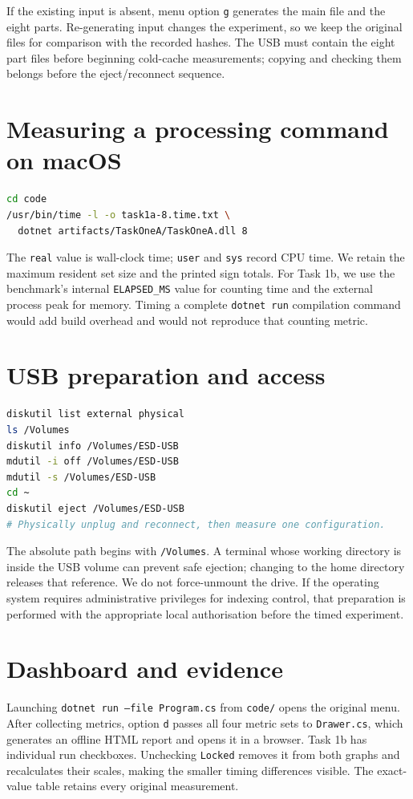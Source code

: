 If the existing input is absent, menu option \texttt{g} generates the main file and the eight parts. Re-generating input changes the experiment, so we keep the original files for comparison with the recorded hashes. The USB must contain the eight part files before beginning cold-cache measurements; copying and checking them belongs before the eject/reconnect sequence.

\section{Measuring a processing command on macOS}
\begin{lstlisting}[language=bash,caption={An example of whole-process timing and peak-memory capture.}]
cd code
/usr/bin/time -l -o task1a-8.time.txt \
  dotnet artifacts/TaskOneA/TaskOneA.dll 8
\end{lstlisting}
The \texttt{real} value is wall-clock time; \texttt{user} and \texttt{sys} record CPU time. We retain the maximum resident set size and the printed sign totals. For Task 1b, we use the benchmark's internal \texttt{ELAPSED\_MS} value for counting time and the external process peak for memory. Timing a complete \texttt{dotnet run} compilation command would add build overhead and would not reproduce that counting metric.

\section{USB preparation and access}
\begin{lstlisting}[language=bash,caption={Checking and preparing the USB volume.}]
diskutil list external physical
ls /Volumes
diskutil info /Volumes/ESD-USB
mdutil -i off /Volumes/ESD-USB
mdutil -s /Volumes/ESD-USB
cd ~
diskutil eject /Volumes/ESD-USB
# Physically unplug and reconnect, then measure one configuration.
\end{lstlisting}
The absolute path begins with \texttt{/Volumes}. A terminal whose working directory is inside the USB volume can prevent safe ejection; changing to the home directory releases that reference. We do not force-unmount the drive. If the operating system requires administrative privileges for indexing control, that preparation is performed with the appropriate local authorisation before the timed experiment.

\section{Dashboard and evidence}
Launching \texttt{dotnet run --file Program.cs} from \texttt{code/} opens the original menu. After collecting metrics, option \texttt{d} passes all four metric sets to \texttt{Drawer.cs}, which generates an offline HTML report and opens it in a browser. Task 1b has individual run checkboxes. Unchecking \texttt{Locked} removes it from both graphs and recalculates their scales, making the smaller timing differences visible. The exact-value table retains every original measurement.

